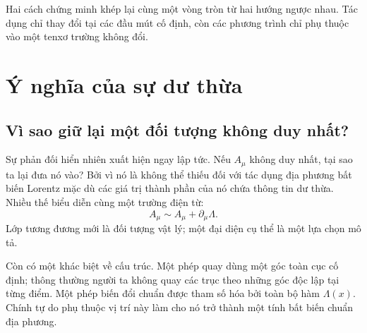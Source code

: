 Hai cách chứng minh khép lại cùng một vòng tròn từ hai hướng ngược nhau. Tác dụng chỉ thay đổi tại các đầu mút cố định, còn các phương trình chỉ phụ thuộc vào một tenxơ trường không đổi.

\section{Ý nghĩa của sự dư thừa}

\subsection{Vì sao giữ lại một đối tượng không duy nhất?}

Sự phản đối hiển nhiên xuất hiện ngay lập tức. Nếu \(A_\mu\) không duy nhất, tại sao ta lại đưa nó vào? Bởi vì nó là không thể thiếu đối với tác dụng địa phương bất biến Lorentz mặc dù các giá trị thành phần của nó chứa thông tin dư thừa. Nhiều thế biểu diễn cùng một trường điện từ:
\begin{equation}
A_\mu
\sim
A_\mu+\partial_\mu\Lambda.
\end{equation}
Lớp tương đương mới là đối tượng vật lý; một đại diện cụ thể là một lựa chọn mô tả.

\begin{classroomqa}
\end{classroomqa}

\begin{classroomqa}
\end{classroomqa}

Còn có một khác biệt về cấu trúc. Một phép quay dùng một góc toàn cục cố định; thông thường người ta không quay các trục theo những góc độc lập tại từng điểm. Một phép biến đổi chuẩn được tham số hóa bởi toàn bộ hàm \(\Lambda(x)\). Chính tự do phụ thuộc vị trí này làm cho nó trở thành một tính bất biến chuẩn địa phương.

